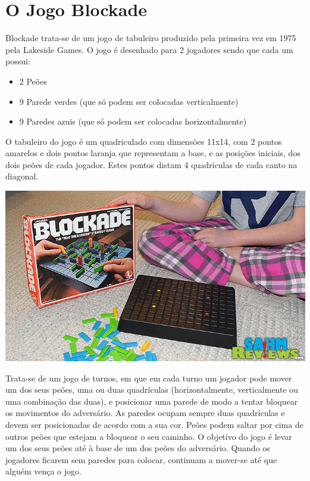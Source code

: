 \documentclass[a4paper]{article}
\begin{document}
\newpage
\section{O Jogo Blockade}

Blockade trata-se de um jogo de tabuleiro produzido pela primeira vez em 1975 pela Lakeside Games.
O jogo é desenhado para 2 jogadores sendo que cada um possui: 

\begin{itemize}
\item 2 Peões
\item 9 Parede verdes (que só podem ser colocadas verticalmente)
\item 9 Paredes azuis (que só podem ser colocadas horizontalmente)
\end{itemize}

O tabuleiro do jogo é um quadriculado com dimensões 11x14, com 2 pontos amarelos e dois pontos laranja que representam a base, e as posições iniciais, dos dois peões de cada jogador. Estes pontos distam 4 quadrículas de cada canto na diagonal. 

\begin{center}
\includegraphics[scale = 0.3]{fig1.jpg}
\end{center}

Trata-se de um jogo de turnos, em que em cada turno um jogador pode mover um dos seus peões, uma ou duas quadrículas (horizontalmente, verticalmente ou uma combinação das duas), e posicionar uma parede de modo a tentar bloquear os movimentos do adversário.
As paredes ocupam sempre duas quadrículas e devem ser posicionadas de acordo com a sua cor. Peões podem saltar por cima de outros peões que estejam a bloquear o seu caminho.
O objetivo do jogo é levar um dos seus peões até à base de um dos peões do adversário. Quando os jogadores ficarem sem paredes para colocar, continuam a mover-se até que alguém vença o jogo. 
\end{document}
